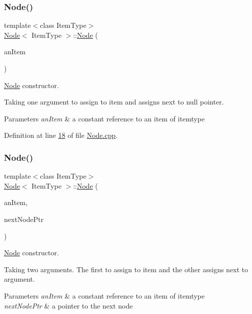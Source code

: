 \subsubsection{\texorpdfstring{Node()}{Node()}\hspace{0.1cm}{\footnotesize\ttfamily [2/3]}}
{\footnotesize\ttfamily template$<$class Item\+Type$>$ \\
\hyperlink{classNode}{Node}$<$ Item\+Type $>$\+::\hyperlink{classNode}{Node} (\begin{DoxyParamCaption}\item[{const Item\+Type \&}]{an\+Item }\end{DoxyParamCaption})}



\hyperlink{classNode}{Node} constructor. 

Taking one argument to assign to item and assigns next to null pointer. 
\begin{DoxyParams}{Parameters}
{\em an\+Item} & a constant reference to an item of itemtype \\
\hline
\end{DoxyParams}


Definition at line \hyperlink{Node_8cpp_source_l00018}{18} of file \hyperlink{Node_8cpp_source}{Node.\+cpp}.

\mbox{\label{classNode_adf98d3f9b7227622cb5a0fdd7e8f0b18}} 
\subsubsection{\texorpdfstring{Node()}{Node()}\hspace{0.1cm}{\footnotesize\ttfamily [3/3]}}
{\footnotesize\ttfamily template$<$class Item\+Type$>$ \\
\hyperlink{classNode}{Node}$<$ Item\+Type $>$\+::\hyperlink{classNode}{Node} (\begin{DoxyParamCaption}\item[{const Item\+Type \&}]{an\+Item,  }\item[{\hyperlink{classNode}{Node}$<$ Item\+Type $>$ $\ast$}]{next\+Node\+Ptr }\end{DoxyParamCaption})}



\hyperlink{classNode}{Node} constructor. 

Taking two arguments. The first to assign to item and the other assigns next to argument. 
\begin{DoxyParams}{Parameters}
{\em an\+Item} & a constant reference to an item of itemtype \\
\hline
{\em next\+Node\+Ptr} & a pointer to the next node \\
\hline
\end{DoxyParams}


